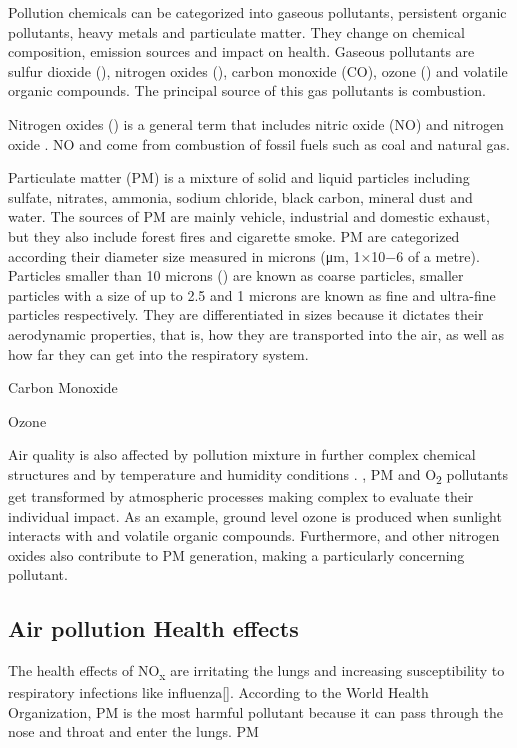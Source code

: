 Pollution chemicals can be categorized into gaseous pollutants, persistent organic pollutants, heavy metals and particulate matter. They change on chemical composition, emission sources and impact on health. Gaseous pollutants are sulfur dioxide (\SOTWO), nitrogen oxides (\NOX), carbon monoxide (CO), ozone (\OTHREE) and volatile organic compounds. The principal source of this gas pollutants is combustion. 

Nitrogen oxides (\NOX) is a general term that includes nitric oxide (NO) and nitrogen oxide \NOTWO. NO and \NOTWO come from combustion of fossil fuels such as coal and natural gas.

Particulate matter (PM) is a mixture of solid and liquid particles including sulfate, nitrates, ammonia, sodium chloride, black carbon, mineral dust and water. The sources of PM are mainly vehicle, industrial and domestic exhaust, but they also include forest fires and cigarette smoke. PM are categorized according their diameter size measured in microns (μm, 1×10−6 of a metre). Particles smaller than 10 microns (\PMTEN) are known as coarse particles, smaller particles with a size of up to 2.5  and 1 microns are known as fine and ultra-fine particles respectively. They are differentiated in sizes because it dictates their aerodynamic properties, that is, how they are transported into the air, as well as how far they can get into the respiratory system.

Carbon Monoxide

Ozone 

Air quality is also affected by pollution mixture in further complex chemical structures and by temperature and humidity conditions . \NOTWO, PM and O\textsubscript{2}  pollutants get transformed by atmospheric processes making complex to evaluate their individual impact. As an example, ground level ozone is produced when sunlight interacts with \NOTWO and volatile organic compounds. Furthermore, \NOTWO and other nitrogen oxides also contribute to PM generation, making \NOX a particularly concerning pollutant.


\subsection{Air pollution Health effects}

 The health effects of NO\textsubscript{x} are irritating the lungs and increasing susceptibility to respiratory infections like influenza[].
 According to the World Health Organization, PM is the most harmful pollutant because it can pass through the nose and throat and enter the lungs. PM 
 
